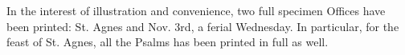 
\renewcommand{\newline}{\par \noindent}

\newcommand{\rub}[1]{\textcolor{Red}{\itshape #1}}

\thispagestyle{fancy}

\vspace{+.5em}


In the interest of illustration and convenience, two full specimen Offices have been printed: St. Agnes and Nov. 3rd, a ferial Wednesday. In particular, for the feast of St. Agnes, all the Psalms has been printed in full as well.

\vspace{+.5em}


